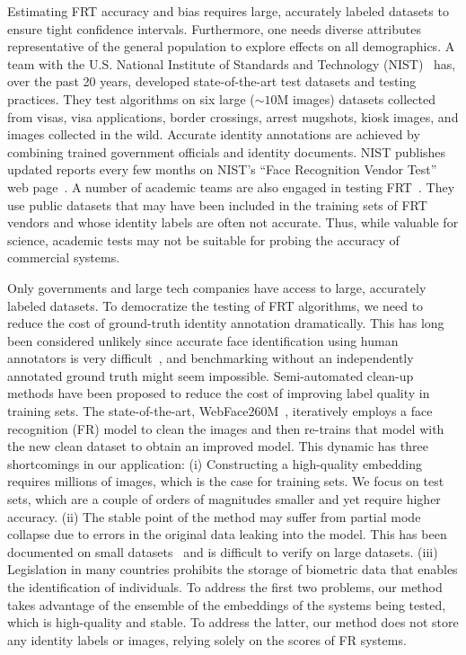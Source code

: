 \documentclass[10pt,twocolumn,letterpaper]{article}
\newcommand*{\simsym}{\mathord\sim}
\begin{document}
Estimating FRT accuracy and bias requires large, accurately labeled datasets to ensure tight confidence intervals. Furthermore, one needs diverse attributes representative of the general population to explore effects on all demographics.  A team with the U.S. National Institute of Standards and Technology (NIST)~\cite{grother2014face,grother2019face} has, over the past 20 years, developed state-of-the-art test datasets and testing practices. They test algorithms on six large ($\simsym 10$M images) datasets collected from visas, visa applications, border crossings, arrest mugshots, kiosk images, and images collected in the wild. Accurate identity annotations are achieved by combining trained government officials and identity documents. NIST publishes updated reports every few months on  NIST's  ``Face Recognition Vendor Test'' web page~\cite{nist_frvt}. A number of academic teams are also engaged in testing FRT~\cite{albiero2020analysis,albiero2020does,albiero2021gendered,krishnapriya2020issues}. They use public datasets that may have been included in the training sets of FRT vendors and whose identity labels are often not accurate. Thus, while valuable for science, academic tests may not be suitable for probing the accuracy of commercial systems.

Only governments and large tech companies have access to large, accurately labeled datasets. 
To democratize the testing of FRT algorithms, we need to reduce the cost of ground-truth identity annotation dramatically.
This has long been considered unlikely since accurate face identification using human annotators is very difficult~\cite{phillips2018face}, and benchmarking without an independently annotated ground truth might seem impossible. Semi-automated clean-up methods have been proposed to reduce the cost of improving label quality in training sets. The state-of-the-art, WebFace260M~\cite{webface260}, iteratively employs a face recognition (FR) model to clean the images and then re-trains that model with the new clean dataset to obtain an improved model. This dynamic has three shortcomings in our application: (i) Constructing a high-quality embedding requires millions of images, which is the case for training sets. We focus on test sets, which are a couple of orders of magnitudes smaller and yet require higher accuracy. (ii) The stable point of the method may suffer from partial mode collapse due to errors in the original data leaking into the model. This has been documented on small datasets~\cite{shumailov2024ai} and is difficult to verify on large datasets. (iii) Legislation in many countries prohibits the storage of biometric data that enables the identification of individuals. To address the first two problems, our method takes advantage of the ensemble of the embeddings of the systems being tested, which is high-quality and stable. To address the latter, our method does not store any identity labels or images, relying solely on the scores of FR systems.
\end{document}
